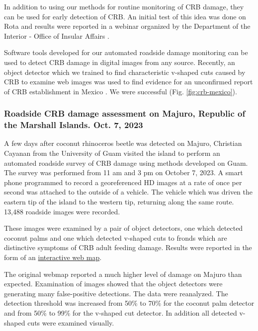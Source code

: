 \documentclass[12pt,letterpaper,english,bibliography=totocnumbered, abstract=on]{scrartcl}
\begin{document}
In addition to using our methods for routine monitoring of CRB damage, they can be used for early detection of CRB. An initial test of this idea was done on Rota and results were reported in a webinar organized by the Department of the Interior - Office of Insular Affairs  \cite{usdepartmentoftheinterior-officeofinsularaffairsYouTubeVideoCoconut2021}.

Software tools developed for our automated roadside damage monitoring can be used to detect CRB damage in digital images from any source. Recently, an object detector which we trained to find characteristic v-shaped cuts caused by CRB to examine web images was used to find evidence for an unconfirmed report of CRB establishment in Mexico \cite{jacksonSocialMediaPosts2022}. We were successful (Fig.  \ref{fig:crb-mexico}).

\clearpage
\subsubsection{Roadside CRB damage assessment on Majuro, Republic of the Marshall Islands. Oct. 7, 2023}

A few days after coconut rhinoceros beetle was detected on Majuro, Christian Cayanan from the University of Guam visited the island to perform an automated roadside survey of CRB damage using methods developed on Guam. The survey was performed from 11 am and 3 pm on October 7, 2023. A smart phone programmed to record a georeferenced HD images at a rate of once per second was attached to the outside of a vehicle. The vehicle which was driven the eastern tip of the island to the western tip, returning along the same route. 13,488 roadside images were recorded.

These images were examined by a pair of object detectors, one which detected coconut palms and one which detected v-shaped cuts to fronds which are distinctive symptoms of CRB adult feeding damage. Results were reported in the form of an \href{https://aubreymoore.github.io/Majuro-CRB-Damage-Map-2023-10/webmap/#12/7.1098/171.2099}{interactive web map}. 

The original webmap reported a much higher level of damage on Majuro than expected. Examination of images showed that the object detectors were generating many false-positive detections. The data were reanalyzed. The detection threshold was increased from 50\% to 70\% for the coconut palm detector and from 50\% to 99\% for the v-shaped cut detector. In addition all detected v-shaped cuts were examined visually.
\end{document}
